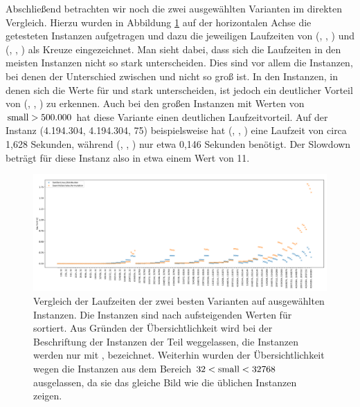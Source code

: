 Abschließend betrachten wir noch die zwei ausgewählten Varianten im direkten Vergleich. Hierzu wurden
in Abbildung \ref{fig:messung_small} auf der horizontalen Achse die getesteten Instanzen aufgetragen
und dazu die jeweiligen Laufzeiten von (\SorSor, \true, \distr) und (\SeaUSet, \false, \perm) als Kreuze
eingezeichnet. 
Man sieht dabei, dass sich die Laufzeiten in den meisten Instanzen nicht so stark unterscheiden.
Dies sind vor allem die Instanzen, bei denen der Unterschied zwischen \la{} und \sm{} nicht so groß ist.
In den Instanzen, in denen sich die Werte für \sm{} und \la{} stark unterscheiden, ist jedoch ein 
deutlicher Vorteil von (\SorSor, \true, \distr) zu erkennen. Auch bei den \glqq großen\grqq{} Instanzen
mit Werten von $\text{small{}}> 500.000$ hat diese Variante einen deutlichen Laufzeitvorteil.
Auf der Instanz (4.194.304, 4.194.304, 75) beispielsweise hat (\SeaUSet, \false, \perm) eine Laufzeit
von circa 1,628 Sekunden, während (\SorSor, \true, \distr) nur etwa 0,146 Sekunden benötigt. Der Slowdown
beträgt für diese Instanz also in etwa einem Wert von 11. 
\begin{figure}
\centering
	\includegraphics[width = \textwidth]{figures/small_aufsteigend.pdf}
	\caption{Vergleich der Laufzeiten der zwei besten Varianten auf ausgewählten Instanzen.
			Die Instanzen sind nach aufsteigenden Werten für \sm{} sortiert. Aus Gründen der Übersichtlichkeit
wird bei  der Beschriftung der Instanzen der Teil \fr{} weggelassen, die Instanzen werden 
nur mit \la{}, \sm{} bezeichnet. Weiterhin wurden der
Übersichtlichkeit wegen die Instanzen aus dem Bereich $32 < \text{small}  <32768$ ausgelassen, da sie das gleiche
Bild wie die üblichen Instanzen zeigen.}
	\label{fig:messung_small}
\end{figure}


